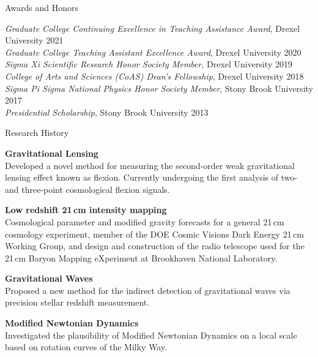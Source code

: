 \documentclass{resume} %
\begin{document}

\begin{rSection}{Awards and Honors}

\textit{Graduate College Continuing Excellence in Teaching Assistance Award}, Drexel University \hfill{2021} \\
\textit{Graduate College Teaching Assistant Excellence Award}, Drexel University \hfill{2020} \\
\textit{Sigma Xi Scientific Research Honor Society Member}, Drexel University \hfill{2019}\\
\textit{College of Arts and Sciences (CoAS) Dean's Fellowship}, Drexel University \hfill {2018}\\
\textit{Sigma Pi Sigma National Physics Honor Society Member}, Stony Brook University \hfill{2017}\\
\textit{Presidential Scholarship}, Stony Brook University \hfill {2013}

\end{rSection}


\begin{rSection}{Research History}

\begin{description}[leftmargin=8em, style=nextline]

\item[\textnormal{2018 -- Present}] \textbf{Gravitational Lensing}\\
Developed a novel method for measuring the second-order weak gravitational lensing effect known as flexion. Currently undergoing the first analysis of two- and three-point cosmological flexion signals.  
\item[\textnormal{2015 -- Present}] \textbf{Low redshift 21$\,$cm intensity mapping}\\
 Cosmological parameter and modified gravity forecasts for a general 21$\,$cm cosmology 
 experiment, member of the DOE Cosmic Visions Dark Energy 21$\,$cm Working Group, and design and construction
 of the radio telescope used for the 21$\,$cm Baryon Mapping eXperiment at Brookhaven National
 Laboratory.
\item[\textnormal{2013}] \textbf{Gravitational Waves}\\
 Proposed a new method for the indirect detection of gravitational waves via precision 
 stellar redshift measurement.
\item[\textnormal{2012}] \textbf{Modified Newtonian Dynamics}\\
 Investigated the plausibility of Modified Newtonian Dynamics on a local scale based on
 rotation curves of the Milky Way.

\end{description}

\end{rSection}
\end{document}
